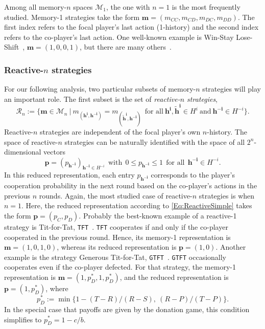 \documentclass[9pt,twoside,lineno]{pnas-new}
\theoremstyle{plainCl1}
\theoremstyle{plainCl2}
\def\tft{\texttt{TFT}}
\def\gtft{\texttt{GTFT}}
\begin{document}

Among all memory-$n$ spaces $\mathcal{M}_1$, the one with $n\!=\!1$ is the most frequently studied. 
Memory-1 strategies take the form $\mathbf{m}\!=\!(m_{CC}, m_{CD}, m_{DC}, m_{DD})$. 
The first index refers to the focal player's last action (1-history) and the second index refers to the co-player's last action. 
One well-known example is Win-Stay Lose-Shift~\citep{nowak:Nature:1993}, $\mathbf{m}\!=\!(1,0,0,1)$, but there are many others~\citep{hilbe:Nature:2018}.


\noindent
\subsubsection*{Reactive-$n$ strategies} For our following analysis, two particular subsets of memory-$n$ strategies will play an important role. 
The first subset is the set of {\it reactive-$n$ strategies}, 
\begin{equation}
\mathcal{R}_n:=\Big\{ \mathbf{m}\!\in\!\mathcal{M}_n ~\Big|~ m_{(\mathbf{h^i},\mathbf{h^{-i}})}\!=\!m_{(\mathbf{\tilde{h}^i},\mathbf{h^{-i}})}~~\text{for all}~\mathbf{h^i}, \mathbf{\tilde{h}^i}\!\in\!H^i~\text{and}~\mathbf{h^{-i}}\!\in\!H^{-i}\Big\}.
\end{equation}
Reactive-$n$ strategies are independent of the focal player's own $n$-history. 
The space of \mbox{reactive-$n$} strategies can be naturally identified with the space of all $2^n$-dimensional vectors 
\begin{equation}\label{Eq:ReactiveSimple}
\mathbf{p}\!=\!(p_\mathbf{h^{-i}})_{\mathbf{h^{-i}}\in H^{-i}} ~~\text{with}~~ 0\!\le\!p_\mathbf{h^{-i}}\!\le\!1 ~~\text{for all}~~ \mathbf{h^{-i}}\!\in\! H^{-i}.
\end{equation}
In this reduced representation, each entry $p_{\mathbf{h^{-i}}}$ corresponds to the player's cooperation
probability in the next round based on the co-player's actions in the previous
$n$ rounds. 
Again, the most studied case of reactive-$n$ strategies is when $n\!=\!1$.
Here, the reduced representation according to \eqref{Eq:ReactiveSimple} takes the form $\mathbf{p}\!=\!(p_C,p_D)$.
Probably the best-known example of a reactive-1 strategy is Tit-for-Tat, \tft~\citep{axelrod:AAAS:1981}. 
\tft{} cooperates if and only if the co-player cooperated in the previous round. 
Hence, its memory-1 representation is $\mathbf{m}\!=\!(1,0,1,0)$, whereas its reduced representation is $\mathbf{p}\!=\!(1,0)$. 
Another example is the strategy Generous Tit-for-Tat, \gtft~\citep{nowak:Nature:1992,molander:jcr:1985}.
\gtft{} occasionally cooperates even if the co-player defected. 
For that strategy, the memory-1 representation is $\mathbf{m}\!=\!(1,p^*_D,1,p^*_D)$, and the reduced representation is $\mathbf{p}\!=\!(1,p^*_D)$, where 
\begin{equation} \label{Eq:ConditionGTFT}
p^*_D\!:=\!\min\big\{1\!-\!(T\!-\!R)/(R\!-\!S),~(R\!-\!P)/(T\!-\!P)\big\}.
\end{equation} 
In the special case that payoffs are given by the donation game, this condition simplifies to $p^*_D\!=\!1-c/b$.
\end{document}

